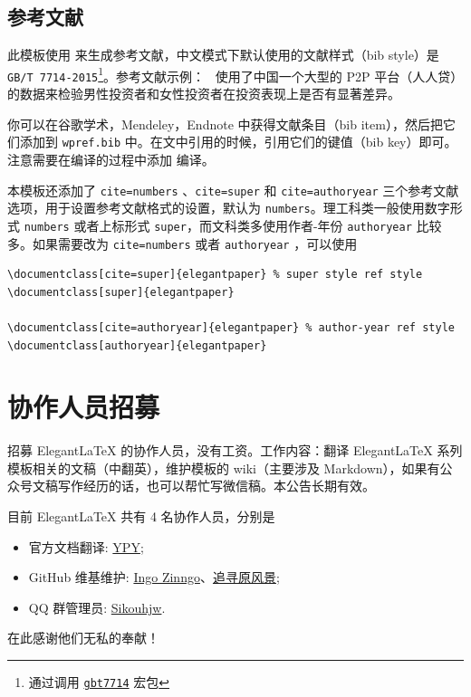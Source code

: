 \documentclass[lang=cn,11pt,a4paper,cite=authoryear]{elegantpaper}
\begin{document}
\subsection{参考文献}
此模板使用  来生成参考文献，中文模式下默认使用的文献样式（bib style）是 \lstinline{GB/T 7714-2015}\footnote{通过调用 \href{https://ctan.org/pkg/gbt7714}{\lstinline{gbt7714}} 宏包}。参考文献示例：~\cite{en3} 使用了中国一个大型的 P2P 平台（人人贷）的数据来检验男性投资者和女性投资者在投资表现上是否有显著差异。

你可以在谷歌学术，Mendeley，Endnote 中获得文献条目（bib item），然后把它们添加到 \lstinline{wpref.bib} 中。在文中引用的时候，引用它们的键值（bib key）即可。注意需要在编译的过程中添加  编译。

本模板还添加了 \lstinline{cite=numbers} 、\lstinline{cite=super} 和 \lstinline{cite=authoryear}  三个参考文献选项，用于设置参考文献格式的设置，默认为 \lstinline{numbers}。理工科类一般使用数字形式 \lstinline{numbers} 或者上标形式 \lstinline{super}，而文科类多使用作者-年份 \lstinline{authoryear} 比较多。如果需要改为 \lstinline{cite=numbers}  或者  \lstinline{authoryear} ，可以使用
\begin{lstlisting}
\documentclass[cite=super]{elegantpaper} % super style ref style
\documentclass[super]{elegantpaper}

\documentclass[cite=authoryear]{elegantpaper} % author-year ref style
\documentclass[authoryear]{elegantpaper}
\end{lstlisting}


\section{协作人员招募}
招募 Elegant\LaTeX{} 的协作人员，没有工资。工作内容：翻译 Elegant\LaTeX{} 系列模板相关的文稿（中翻英），维护模板的 wiki（主要涉及 Markdown），如果有公众号文稿写作经历的话，也可以帮忙写微信稿。本公告长期有效。

目前 ElegantLaTeX 共有 4 名协作人员，分别是
\begin{itemize}
  \item 官方文档翻译: \href{https://github.com/peggy2006xzyz}{YPY};
  \item GitHub 维基维护: \href{https://github.com/izinngo}{Ingo Zinngo}、\href{https://github.com/xiaohao890809}{追寻原风景};
  \item QQ 群管理员: \href{https://github.com/sikouhjw}{Sikouhjw}.
\end{itemize}

在此感谢他们无私的奉献！
\end{document}
